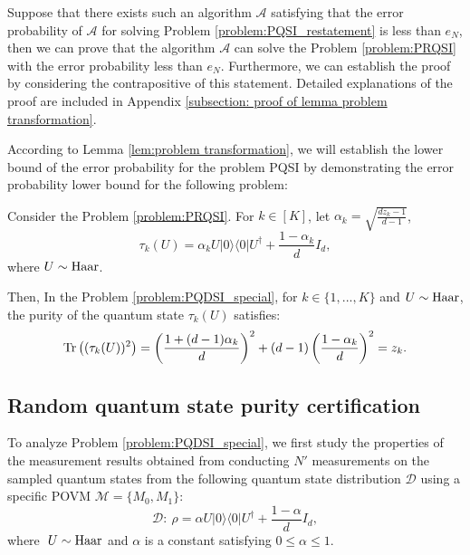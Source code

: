 \begin{proof-sketch}
    Suppose that there exists such an algorithm $\mathcal{A}$ satisfying that the error probability of $\mathcal{A}$ for solving Problem \ref{problem:PQSI_restatement} is less than $e_N$, then we can prove that the algorithm $\mathcal{A}$ can solve the Problem \ref{problem:PRQSI} with the error probability less than $e_N$. Furthermore, we can establish the proof by considering the contrapositive of this statement. Detailed explanations of the proof are included in Appendix \ref{subsection: proof of lemma problem transformation}.
\end{proof-sketch}

According to Lemma \ref{lem:problem transformation}, we will establish the lower bound of the error probability for the problem PQSI by demonstrating the error probability lower bound for the following problem:

\begin{problem}\label{problem:PQDSI_special}
    Consider the Problem \ref{problem:PRQSI}. For $k \in [K]$, let $\alpha_k  = \sqrt{\frac{dz_k -1}{d-1}}$,
    \begin{equation}
        \tau_k(U) = \alpha_k U| 0 \rangle \langle 0|U^\dagger +  \frac{1-\alpha_k}{d} I_d, 
    \end{equation}
    where $U \sim \mathrm{Haar}$.
\end{problem}

Then, In the Problem \ref{problem:PQDSI_special}, for $k \in \{1,...,K\}$ and $U \sim \mathrm{Haar}$, the purity of the quantum state $\tau_k(U)$ satisfies:
\begin{equation*}
    \mathrm{Tr}\left((\tau_k(U))^2\right) = \left(\frac{1 + (d-1)\alpha_k}{d}\right)^2 + (d-1) \left(\frac{1-\alpha_k}{d}\right)^2 = z_k.
\end{equation*}

\subsection{Random quantum state purity certification}

To analyze Problem \ref{problem:PQDSI_special}, we first study the properties of the measurement results obtained from conducting $ N' $ measurements on the sampled quantum states from the following quantum state distribution $\mathcal{D}$ using a specific POVM $\mathcal{M} =\{M_0, M_1\}$:
\begin{equation}
    \label{eq:Haar state}
    \mathcal{D}:\ \rho = \alpha U| 0 \rangle \langle 0|U^\dagger +  \frac{1-\alpha}{d} I_d,
\end{equation}
where $\ U \sim \mathrm{Haar}$ and $\alpha$ is a constant satisfying $0\leq \alpha \leq 1$.

